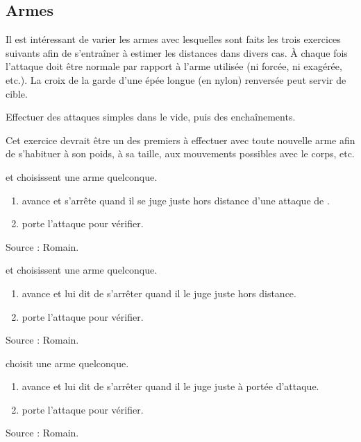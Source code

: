 \subsection{Armes}


Il est intéressant de varier les armes avec lesquelles sont faits les trois exercices suivants afin de s'entraîner à estimer les distances dans divers cas.
À chaque fois l'attaque doit être normale par rapport à l'arme utilisée (ni forcée, ni exagérée, etc.).
La croix de la garde d'une épée longue (en nylon) renversée peut servir de cible.


\begin{exercice}
Effectuer des attaques simples dans le vide, puis des enchaînements.

Cet exercice devrait être un des premiers à effectuer avec toute nouvelle arme afin de s'habituer à son poids, à sa taille, aux mouvements possibles avec le corps, etc.
\end{exercice}


\begin{exercice}
\A et \D choisissent une arme quelconque.

\begin{enumerate}
	\item \A avance et s'arrête quand il se juge juste hors distance d'une attaque de \D.
	
	\item \D porte l'attaque pour vérifier.
\end{enumerate}

Source : Romain.

\end{exercice}


\begin{exercice}
\A et \D choisissent une arme quelconque.

\begin{enumerate}
	\item \A avance et \D lui dit de s'arrêter quand il le juge juste hors distance.
	
	\item \A porte l'attaque pour vérifier.
\end{enumerate}

Source : Romain.

\end{exercice}


\begin{exercice}
\A choisit une arme quelconque.

\begin{enumerate}
	\item \D avance et \A lui dit de s'arrêter quand il le juge juste à portée d'attaque.
	
	\item \A porte l'attaque pour vérifier.
\end{enumerate}

Source : Romain.

\end{exercice}


